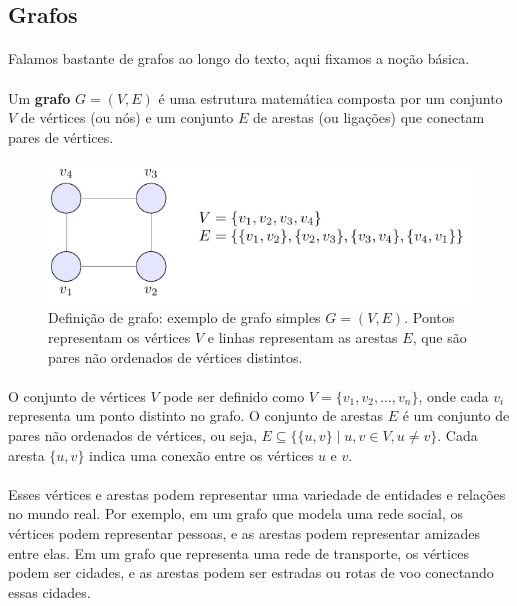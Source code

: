 \documentclass[12pt,a4paper]{article}
\def\emph#1{#1}%
\begin{document}
\subsection{Grafos}
\paragraph{}
Falamos bastante de grafos ao longo do texto, aqui fixamos a noção básica.

\paragraph{}
Um \textbf{grafo} \(G = (V, E)\) é uma estrutura matemática composta por um conjunto \(V\) de \emph{vértices} (ou \emph{nós}) e um conjunto \(E\) de \emph{arestas} (ou \emph{ligações}) que conectam pares de vértices.


\begin{figure}[H]
    \centering
    \includegraphics[width=0.9\linewidth]{figures/fig_def_grafo.pdf}

    \caption{Definição de grafo: exemplo de grafo simples \(G=(V,E)\). Pontos representam os vértices \(V\) e linhas representam as arestas \(E\), que são pares não ordenados de vértices distintos.}
    \label{fig:def-grafo}\end{figure}


\paragraph{}
O conjunto de vértices \(V\) pode ser definido como \(V = \{v_1, v_2, \ldots, v_n\}\), onde cada \(v_i\) representa um ponto distinto no grafo. O conjunto de arestas \(E\) é um conjunto de pares não ordenados de vértices, ou seja, \(E \subseteq \{\{u, v\} \mid u, v \in V, u \neq v\}\). Cada aresta \(\{u, v\}\) indica uma conexão entre os vértices \(u\) e \(v\).

\paragraph{}
Esses vértices e arestas podem representar uma variedade de entidades e relações no mundo real. Por exemplo, em um grafo que modela uma rede social, os vértices podem representar pessoas, e as arestas podem representar amizades entre elas. Em um grafo que representa uma rede de transporte, os vértices podem ser cidades, e as arestas podem ser estradas ou rotas de voo conectando essas cidades.
\end{document}
